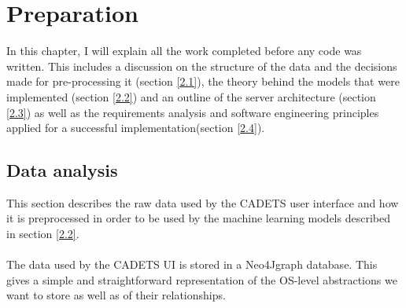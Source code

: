 
	\chapter{Preparation}
	In this chapter, I will explain all the work completed before any code was written. This includes a discussion on the structure of the data and the decisions made for pre-processing it (section \ref{2.1}), the theory behind the models that were implemented (section \ref{2.2}) and an outline of the server architecture (section \ref{2.3}) as well as the requirements analysis and software engineering principles applied for a successful implementation(section \ref{2.4}).
	
	\section{Data analysis} \label{Section 2.1}
	This section describes the raw data used by the CADETS user interface and how it is preprocessed in order to be used by the machine learning models described in section \ref{2.2}.
	\\ \\
	The data used by the CADETS UI is stored in a Neo4J\footnotemark[1] graph database. This gives a simple and straightforward representation of the OS-level abstractions we want to store as well as of their relationships.

	

